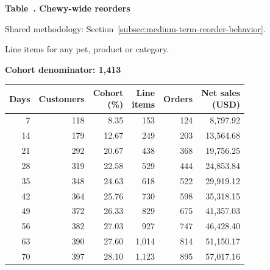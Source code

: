 \label{tab:financial-opportunity-new-chewy-all-chewy}
\par\smallskip\noindent\parbox[t][2\baselineskip][t]{\linewidth}{\raggedright\textbf{Table~\thetable. Chewy-wide reorders}}
\par\raggedright\footnotesize Shared methodology: Section~\ref{subsec:medium-term-reorder-behavior}.
\par\noindent\parbox[t][2\baselineskip][t]{\linewidth}{\raggedright Line items for any pet, product or category.}
\par\noindent\textbf{Cohort denominator: 1,413}
\par\centering\footnotesize
\setlength{\tabcolsep}{2pt}
\begin{tabular}{rrrrrr}\toprule
Days & Customers & \shortstack{Cohort\\(\%)} & \shortstack{Line\\items} & Orders & \shortstack{Net sales\\(USD)} \\ \midrule

7 & 118 & 8.35 & 153 & 124 & 8,797.92 \\

14 & 179 & 12.67 & 249 & 203 & 13,564.68 \\

21 & 292 & 20.67 & 438 & 368 & 19,756.25 \\

28 & 319 & 22.58 & 529 & 444 & 24,853.84 \\

35 & 348 & 24.63 & 618 & 522 & 29,919.12 \\

42 & 364 & 25.76 & 730 & 598 & 35,318.15 \\

49 & 372 & 26.33 & 829 & 675 & 41,357.03 \\

56 & 382 & 27.03 & 927 & 747 & 46,428.40 \\

63 & 390 & 27.60 & 1,014 & 814 & 51,150.17 \\

70 & 397 & 28.10 & 1,123 & 895 & 57,017.16 \\
\bottomrule\end{tabular}\par
